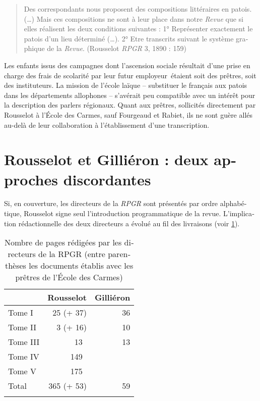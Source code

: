 \documentclass[output=paper]{../langscibook}
\begin{document}
\begin{otherlanguage}{french}
\begin{quote}
    Des correspondants nous proposent des compositions littéraires en patois. (…) Mais ces compositions ne sont à leur place dans notre \textit{Revue} que si elles réalisent les deux conditions suivantes : 1° Représenter exactement le patois d’un lieu déterminé (…). 2° Etre transcrits suivant le système graphique de la \textit{Revue}. (Rousselot \textit{RPGR} 3, 1890 : 159)
\end{quote}

Les enfants issus des campagnes dont l’ascension sociale résultait d’une prise en charge des frais de scolarité par leur futur employeur~étaient soit des prêtres, soit des instituteurs. La mission de l’école laïque – substituer le français aux patois dans les départements allophones – s’avérait peu compatible avec un intérêt pour la description des parlers régionaux. Quant aux prêtres, sollicités directement par Rousselot à l’École des Carmes, sauf Fourgeaud et Rabiet, ils ne sont guère allés au-delà de leur collaboration à l’établissement d’une transcription. 

\section{Rousselot et Gilliéron : deux approches discordantes}

Si, en couverture, les directeurs de la \textit{RPGR} sont présentés par ordre alphabétique, Rousselot signe seul l’introduction programmatique de la revue. L’implication rédactionnelle des deux directeurs a évolué au fil des livraisons (voir \ref{table: Tab.1}).

\begin{table}
\begin{tabular}{lrr}
\lsptoprule
          &    Rousselot    &    Gilliéron \\\midrule
Tome I   &   25  (+ 37)     &         36 \\
Tome II  &  3 (+ 16)           &    10 \\
Tome III  &  13~       &         13 \\
Tome IV  &   149~  & \\
Tome V  &  175~      &    \\\midrule
Total   &   365 (+ 53)     &         59\\
\lspbottomrule 
\end{tabular}
\caption{Nombre de pages rédigées par les directeurs de la RPGR (entre parenthèses les documents établis avec les prêtres de l’École des Carmes)\label{table: Tab.1}}
\end{table}


\end{otherlanguage}
\end{document}
